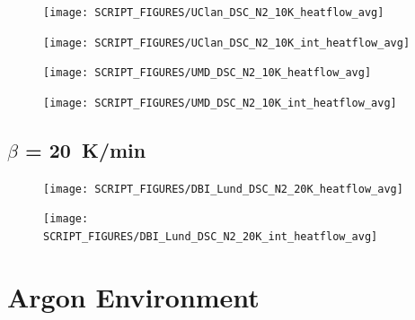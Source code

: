 \documentclass{book}
\begin{document}
\begin{landscape}
\begin{minipage}{0.65\textwidth}
\begin{figure}[H]
{\texttt{[image: SCRIPT\_FIGURES/UClan\_DSC\_N2\_10K\_heatflow\_avg]}}\\
\end{figure}
\end{minipage}
\begin{minipage}{0.35\textwidth}
\begin{figure}[H]
{\texttt{[image: SCRIPT\_FIGURES/UClan\_DSC\_N2\_10K\_int\_heatflow\_avg]}}\\
\end{figure}
\end{minipage}

\begin{minipage}{0.65\textwidth}
\begin{figure}[H]
{\texttt{[image: SCRIPT\_FIGURES/UMD\_DSC\_N2\_10K\_heatflow\_avg]}}\\
\end{figure}
\end{minipage}
\begin{minipage}{0.35\textwidth}
\begin{figure}[H]
{\texttt{[image: SCRIPT\_FIGURES/UMD\_DSC\_N2\_10K\_int\_heatflow\_avg]}}\\
\end{figure}
\end{minipage}
\vfill

\newpage
\subsection{$\beta$ = 20~K/min}
\begin{minipage}{0.65\textwidth}
\begin{figure}[H]
{\texttt{[image: SCRIPT\_FIGURES/DBI\_Lund\_DSC\_N2\_20K\_heatflow\_avg]}}\\
\end{figure}
\end{minipage} 
\begin{minipage}{0.35\textwidth}
\begin{figure}[H]
{\texttt{[image: SCRIPT\_FIGURES/DBI\_Lund\_DSC\_N2\_20K\_int\_heatflow\_avg]}}\\
\end{figure}
\end{minipage}
\vfill

\newpage
\section{Argon Environment}
\label{DSC_Ar}

\end{landscape}
\end{document}
